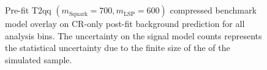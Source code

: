 \begin{figure}[h!]
\begin{center}
{            \label{fig:T2qq_8fold_compressed_MR_4j}
        } \\
         ~~
         \\
        \caption{
            Pre-fit T2qq $(m_{\mathrm{Squark}}=700, m_{\mathrm{LSP}}=600)$
            compressed benchmark model overlay on CR-only post-fit background
            prediction for all analysis bins. The uncertainty on the signal
            model counts represents the statistical uncertainty due to the
            finite size of the of the simulated sample.
        }
        \label{fig:T2qq_8fold_compressed_MR}
    \end{center}
\end{figure}

